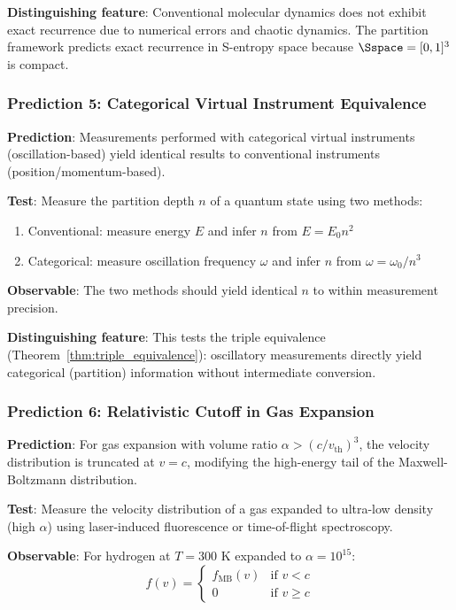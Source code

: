 \textbf{Distinguishing feature}: Conventional molecular dynamics does not exhibit exact recurrence due to numerical errors and chaotic dynamics. The partition framework predicts exact recurrence in S-entropy space because $\Sspace = [0,1]^3$ is compact.

\subsubsection{Prediction 5: Categorical Virtual Instrument Equivalence}

\textbf{Prediction}: Measurements performed with categorical virtual instruments (oscillation-based) yield identical results to conventional instruments (position/momentum-based).

\textbf{Test}: Measure the partition depth $n$ of a quantum state using two methods:
\begin{enumerate}[noitemsep]
    \item Conventional: measure energy $E$ and infer $n$ from $E = E_0 n^2$
    \item Categorical: measure oscillation frequency $\omega$ and infer $n$ from $\omega = \omega_0/n^3$
\end{enumerate}

\textbf{Observable}: The two methods should yield identical $n$ to within measurement precision.

\textbf{Distinguishing feature}: This tests the triple equivalence (Theorem~\ref{thm:triple_equivalence}): oscillatory measurements directly yield categorical (partition) information without intermediate conversion.

\subsubsection{Prediction 6: Relativistic Cutoff in Gas Expansion}

\textbf{Prediction}: For gas expansion with volume ratio $\alpha > (c/v_{\text{th}})^3$, the velocity distribution is truncated at $v = c$, modifying the high-energy tail of the Maxwell-Boltzmann distribution.

\textbf{Test}: Measure the velocity distribution of a gas expanded to ultra-low density (high $\alpha$) using laser-induced fluorescence or time-of-flight spectroscopy.

\textbf{Observable}: For hydrogen at $T = 300$ K expanded to $\alpha = 10^{15}$:
\begin{equation}
f(v) = \begin{cases}
f_{\text{MB}}(v) & \text{if } v < c \\
0 & \text{if } v \geq c
\end{cases}
\end{equation}

